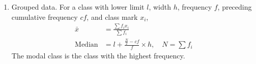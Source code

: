 \begin{enumerate}[label=\thesubsection.\arabic*, ref=\thesubsection.\theenumi]
\begin{align}
	\pr{E} = \sum_{n} p\sbrak{n}\,m\sbrak{n} = \brak{p * h}\sbrak{0} \label{eq:CBSE25S2-prob}
\end{align}
which is the coefficient of $z^{0}$ in $P\brak{z}H\brak{z}$. Also $\pr{E} + \pr{E^{\prime}} = 1$.
\item Grouped data. For a class with lower limit $l$, width $h$, frequency $f$, preceding cumulative frequency $cf$, and class mark $x_i$,
\begin{align}
	\bar{x} &= \frac{\sum f_i x_i}{\sum f_i} \label{eq:CBSE25S2-mean}
	\\
	\text{Median} &= l + \frac{\frac{N}{2} - cf}{f}\times h, \quad N = \sum f_i \label{eq:CBSE25S2-median}
\end{align}
The modal class is the class with the highest frequency. 
\end{enumerate}

